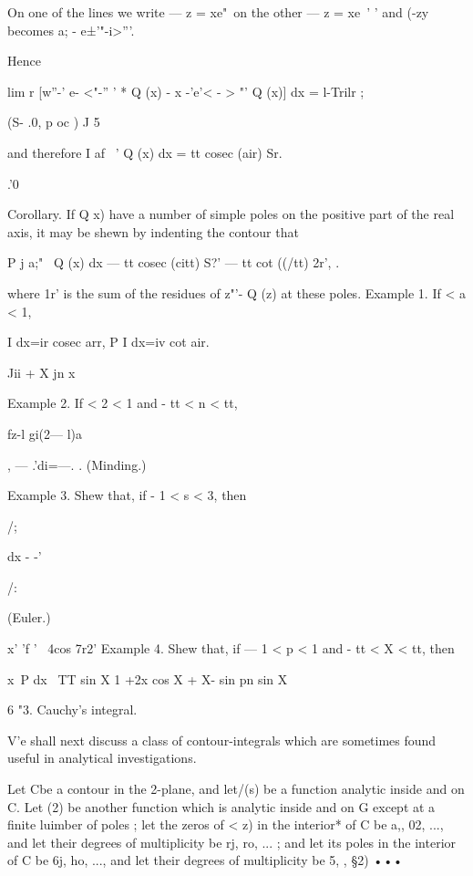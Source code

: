 On one of the lines we write — z = xe"\ on the other — z = xe~' ' and
(-zy~ becomes a; - e±'"-i>'''.

Hence

lim r [w''-' e- <"-'' ' * Q (x) - x -'e'< - > "' Q (x)] dx = l-Trilr ;

(S- .0, p oc ) J 5

and therefore I af ~' Q (x) dx = tt cosec (air) Sr.

.'0

Corollary. If Q x) have a number of simple poles on the positive part
of the real axis, it may be shewn by indenting the contour that

P j a;"~ Q (x) dx — tt cosec (citt) S?' — tt cot ((/tt) 2r', .

where 1r' is the sum of the residues of z"'- Q (z) at these poles.
Example 1. If < a < 1,

I dx=ir cosec arr, P I dx=iv cot air.

Jii + X jn x


%
%

Example 2. If < 2 < 1 and - tt < n < tt,



  



fz-l gi(2— l)a

, — .'di=—. . (Minding.)



Example 3. Shew that, if - 1 < s < 3, then



/;



  dx - -'



/:



(Euler.)



   x' 'f ' ~4cos 7r2' Example 4. Shew that, if — 1 < p < 1 and - tt <
X < tt, then

x~P dx \ TT sin X 1 +2x cos X + X- sin pn sin X

6 "3. Cauchy's integral.

 V'e shall next discuss a class of contour-integrals which are
sometimes found useful in analytical investigations.

Let Cbe a contour in the 2-plane, and let/(s) be a function analytic
inside and on C. Let (2) be another function which is analytic inside
and on G except at a finite luimber of poles ; let the zeros of < z)
in the interior* of C be a,, 02, ..., and let their degrees of
multiplicity be rj, ro, ... ; and let its poles in the interior of C
be 6j, ho, ..., and let their degrees of multiplicity be 5, , §2) •••

